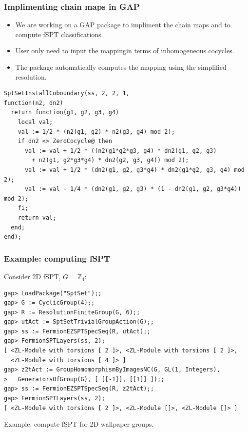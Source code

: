 \documentclass[xcolor=table, aspectratio=169]{beamer}
\begin{document}
\begin{frame}[fragile]
	\frametitle{Implimenting chain maps in GAP}
	\begin{itemize}
		\item We are working on a GAP package to impliment the chain maps and to compute fSPT classifications.
		\item User only need to input the mappingin terms of inhomogeneous cocycles.
		\item The package automatically computes the mapping using the simplified resolution.
	\end{itemize}
\begin{lstlisting}[basicstyle=\footnotesize,morekeywords={function,return,local,if,fi,then,end},showspaces=false,showtabs=false, keywordstyle=\color{blue}]
SptSetInstallCoboundary(ss, 2, 2, 1,
function(n2, dn2)
  return function(g1, g2, g3, g4)
    local val;
    val := 1/2 * (n2(g1, g2) * n2(g3, g4) mod 2);
    if dn2 <> ZeroCocycle@ then
      val := val + 1/2 * ((n2(g1*g2*g3, g4) * dn2(g1, g2, g3)
        + n2(g1, g2*g3*g4) * dn2(g2, g3, g4)) mod 2);
      val := val + 1/2 * (dn2(g1, g2, g3*g4) * dn2(g1*g2, g3, g4) mod 2);
      val := val - 1/4 * (dn2(g1, g2, g3) * (1 - dn2(g1, g2, g3*g4)) mod 2);
    fi;
    return val;
  end;
end);
\end{lstlisting}
\end{frame}

\begin{frame}[fragile]
	\frametitle{Example: computing fSPT}
	Consider 2D fSPT, $G=\mathbb Z_4$:
\begin{lstlisting}[basicstyle=\footnotesize]
gap> LoadPackage("SptSet");;
gap> G := CyclicGroup(4);;
gap> R := ResolutionFiniteGroup(G, 6);;
gap> utAct := SptSetTrivialGroupAction(G);;
gap> ss := FermionEZSPTSpecSeq(R, utAct);;
gap> FermionSPTLayers(ss, 2);
[ <ZL-Module with torsions [ 2 ]>, <ZL-Module with torsions [ 2 ]>,
  <ZL-Module with torsions [ 4 ]> ]
gap> z2tAct := GroupHomomorphismByImagesNC(G, GL(1, Integers),
>   GeneratorsOfGroup(G), [ [[-1]], [[1]] ]);;
gap> ss := FermionEZSPTSpecSeq(R, z2tAct);;
gap> FermionSPTLayers(ss, 2);
[ <ZL-Module with torsions [ 2 ]>, <ZL-Module []>, <ZL-Module []> ]
\end{lstlisting}

Example: compute fSPT for 2D wallpaper groups.
\end{frame}
\end{document}
